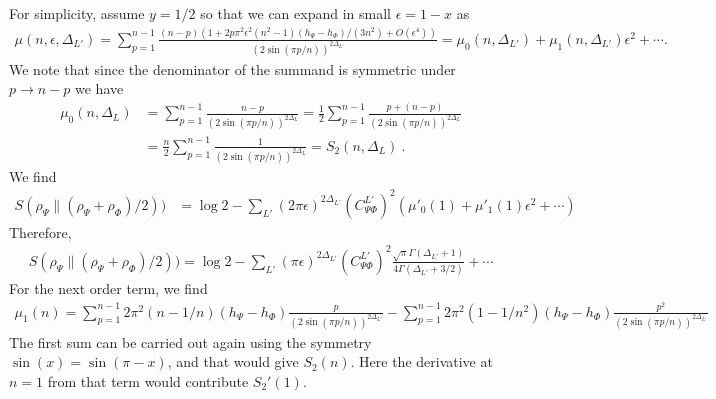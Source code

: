 \documentclass[11pt]{article}
\newcommand{\ep}{\epsilon}
\newcommand{\nn}{\nonumber}
\newcommand{\lb}{\left(}
\newcommand{\rb}{\right)}
\begin{document}
For simplicity, assume $y=1/2$ so that we can expand in small $\ep=1-x$ as
\begin{align}
  \mu(n,\ep,\Delta_{L'})=\sum_{p=1}^{n-1}\frac{(n-p)(1+2p\pi^2\ep^2(n^2-1)(h_\Psi - h_\Phi)/(3n^2)+O(\ep^4))}{(2\sin(\pi p/n))^{2\Delta_{L'}}}=\mu_0(n,\Delta_{L'})+\mu_1(n,\Delta_{L'})\ep^2+\cdots.
\end{align}
We note that since the denominator of the summand is symmetric under $p\to n-p$ we have
\begin{align}
  \mu_0(n,\Delta_{L})&=\sum_{p=1}^{n-1}\frac{n-p}{(2\sin(\pi p/n))^{2\Delta_L}}=\frac{1}{2}\sum_{p=1}^{n-1}\frac{p+(n-p)}{(2\sin(\pi p/n))^{2\Delta_L}}\nn\\
  &=\frac{n}{2}\sum_{p=1}^{n-1}\frac{1}{(2\sin(\pi p/n))^{2\Delta_L}}=S_2(n,\Delta_{L})\ .
\end{align}
We find
\begin{align}
 S(\rho_\Psi\|(\rho_\Psi+\rho_\Phi)/2))&=\log 2-\sum_{L'}(2\pi \ep)^{2\Delta_{L'}}  {(C_{\Psi\Phi}^{L'})}^2(\mu'_0(1)+\mu'_1(1)\ep^2+\cdots)
\end{align} 
Therefore,
\begin{align}
    \boxed{S(\rho_\Psi\|(\rho_\Psi+\rho_\Phi)/2))=\log 2-\sum_{L'}(\pi \ep)^{2\Delta_{L'}} {(C_{\Psi\Phi}^{L'})}^2 \frac{\sqrt{\pi}\Gamma(\Delta_{L'}+1)}{4\Gamma(\Delta_{L'}+3/2)} +\cdots}
\end{align}
For the next order term, we find
\begin{align}
    \mu_1(n) = \sum_{p=1}^{n-1}2\pi^2 \lb n-1/n\rb  (h_\Psi - h_\Phi) \frac{p}{(2\sin(\pi p/n))^{2\Delta_{L'}}} - \sum_{p=1}^{n-1}2\pi^2 (1-1/n^2) (h_\Psi- h_\Phi) \frac{p^2}{(2\sin(\pi p/n))^{2\Delta_{L'}}} 
\end{align}
The first sum can be carried out again using the symmetry $\sin(x) = \sin (\pi - x)$, and that would give $S_2(n)$. Here the derivative at $n=1$ from that term would contribute $S_2'(1)$.
\end{document}
